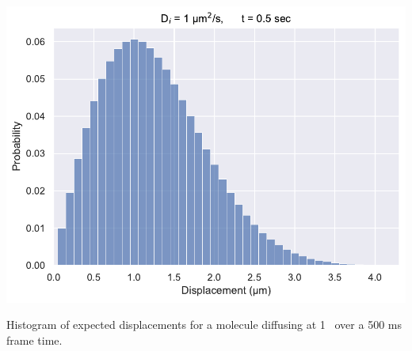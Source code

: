 \begin{suppfigure*}[htbp]
\begin{center}
\end{center}
\caption{}
\label{SIFig:frame_intervals}
\end{suppfigure*}

\begin{suppfigure*}[htbp]
    \begin{center}
    \includegraphics[width=.8\textwidth]{SI_Figures/Displacements_distribution.pdf}
    \end{center}
    \caption{Histogram of expected displacements for a molecule diffusing at 1 \ums\ over a 500 ms frame time.}
    \label{SIFig:displacement_simul}
\end{suppfigure*}
